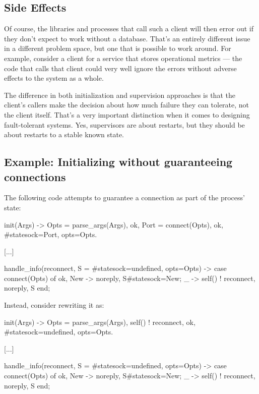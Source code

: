 \documentclass[11pt, oneside]{book}   	%
\begin{document}
\subsection{Side Effects}
\label{subsec:start-link-side-effects}

Of course, the libraries and processes that call such a client will then error out if they don't expect to work without a database. That's an entirely different issue in a different problem space, but one that is possible to work around. For example, consider a client for a service that stores operational metrics — the code that calls that client could very well ignore the errors without adverse effects to the system as a whole. 

The difference in both initialization and supervision approaches is that the client's callers make the decision about how much failure they can tolerate, not the client itself. That's a very important distinction when it comes to designing fault-tolerant systems. Yes, supervisors are about restarts, but they should be about restarts to a stable known state.

\subsection{Example: Initializing without guaranteeing connections}
\label{subsec:start-link-initializing-without-guaranteeing-connections}

The following code attempts to guarantee a connection as part of the process' state:

\begin{VerbatimText}
init(Args) ->
    Opts = parse_args(Args),
    {ok, Port} = connect(Opts),
    {ok, #state{sock=Port, opts=Opts}}.

[...]

handle_info(reconnect, S = #state{sock=undefined, opts=Opts}) ->
    case connect(Opts) of
        {ok, New} -> {noreply, S#state{sock=New}};
         _ -> self() ! reconnect, {noreply, S}
    end;
\end{VerbatimText}

Instead, consider rewriting it as:

\begin{VerbatimText}
init(Args) ->
    Opts = parse_args(Args),
    self() ! reconnect,
    {ok, #state{sock=undefined, opts=Opts}}.

[...]

handle_info(reconnect, S = #state{sock=undefined, opts=Opts}) ->
    case connect(Opts) of
        {ok, New} -> {noreply, S#state{sock=New}};
        _ -> self() ! reconnect, {noreply, S}
    end;
\end{VerbatimText}
\end{document}
